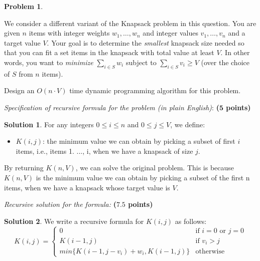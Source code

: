 \documentclass{article}
\theoremstyle{definition}
\newtheorem{problem}{Problem}
\newtheorem*{solution*}{Solution}
\newenvironment{solution}{\begin{solution*}}{{} \end{solution*}}
\newcommand{\grade}[1]{\hfill{\textbf{($\mathbf{#1}$ points)}}}
\begin{document}
\begin{problem}\label{old}

We consider a different variant of the Knapsack problem in this question. You are given $n$ items with integer weights $w_1,\ldots,w_n$ and integer values $v_1,\ldots,v_n$ and a target value $V$. Your goal is to determine the \emph{smallest} knapsack size  needed so that you can fit 
a set items in the knapsack with total value at least $V$. In other words, you want to \emph{minimize} $\sum_{i \in S} w_i$ subject to $\sum_{i \in S} v_i \geq V$ (over the choice of $S$ from $n$ items). 

Design an $O(n \cdot V)$ time dynamic programming algorithm for this problem. 
 


\begin{enumerate}[label=(\alph*)]

	\item \emph{Specification of recursive formula for the problem (in plain English)}: \grade{5}
	
	
		\medskip
		\begin{solution}
		\item For any integers $0 \leq i \leq n$ and $0 \leq j \leq V$, we define:
			\begin{itemize}
			\item $K(i, j)$: the minimum value we can obtain by picking a subset of first $i$ items, i.e., items {1. ..., i}, when we have a knapsack of size $j$.
			\end{itemize}
			\item By returning $K(n, V)$, we can solve the original problem. This is because $K(n, V)$ is the minimum value we can obtain by picking a subset of the first n items, when we have a knapsack whose target value is $V$. 

		\end{solution}
		\vfill
	\item \emph{Recursive solution for the formula:} \grade{7.5}
	
	
		\medskip
		\begin{solution}
		\item We write a recursive formula for $K(i, j)$ as follows:
		\[
			K(i, j) = 
			\begin{cases}
								        0 & \text{if $i=0$ or $j=0$} \\
			   			              K(i-1, j) & \text{if $v_i > j$} \\
			min\{K(i-1, j-v_i) + w_i, K(i-1, j)\} & \text{otherwise}



\end{cases}\]
\end{solution}
\end{enumerate}
\end{problem}
\end{document}
